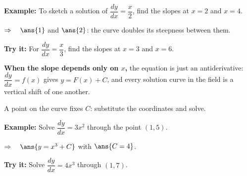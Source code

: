 \documentclass[12pt]{article}
\begin{document}
\begin{examplebox}
\textbf{Example:} \quad To sketch a solution of $\dfrac{dy}{dx} = \dfrac{x}{2}$,
find the slopes at $x = 2$ and $x = 4$.

$\Rightarrow\quad \ans{1}$ \quad and \quad $\ans{2}$: the curve doubles its steepness between them.
\end{examplebox}

\begin{tryitbox}
\textbf{Try it:} \quad For $\dfrac{dy}{dx} = \dfrac{x}{3}$, find the slopes at
$x = 3$ and $x = 6$.\\[2pt]
\end{tryitbox}


\begin{formulabox}
\textbf{When the slope depends only on $x$,} the equation is just an
antiderivative: $\dfrac{dy}{dx} = f(x)$ gives $y = F(x) + C$, and every solution
curve in the field is a vertical shift of one another.\par
A point on the curve fixes $C$: substitute the coordinates and solve.
\end{formulabox}

\begin{examplebox}
\textbf{Example:} \quad Solve $\dfrac{dy}{dx} = 3x^2$ through the point
$(1, 5)$.

$\Rightarrow\quad \ans{y = x^3 + C}$ \quad with \quad $\ans{C = 4}$.
\end{examplebox}

\begin{tryitbox}
\textbf{Try it:} \quad Solve $\dfrac{dy}{dx} = 4x^3$ through $(1, 7)$.\\[2pt]
\end{tryitbox}
\end{document}
